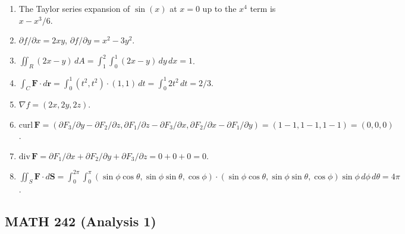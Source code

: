 \begin{enumerate}
\item The Taylor series expansion of $\sin(x)$ at $x = 0$ up to the $x^4$ term is $x - x^3/6$.
\item $\partial f/\partial x = 2xy$, $\partial f/\partial y = x^2 - 3y^2$.
\item $\iint_R (2x - y) \, dA = \int_1^2 \int_0^1 (2x - y) \, dy \, dx = 1$.
\item $\int_C \mathbf{F} \cdot d\mathbf{r} = \int_0^1 (t^2, t^2) \cdot (1, 1) \, dt = \int_0^1 2t^2 \, dt = 2/3$.
\item $\nabla f = (2x, 2y, 2z)$.
\item $\text{curl} \, \mathbf{F} = (\partial F_3/\partial y - \partial F_2/\partial z, \partial F_1/\partial z - \partial F_3/\partial x, \partial F_2/\partial x - \partial F_1/\partial y) = (1 - 1, 1 - 1, 1 - 1) = (0, 0, 0)$.
\item $\text{div} \, \mathbf{F} = \partial F_1/\partial x + \partial F_2/\partial y + \partial F_3/\partial z = 0 + 0 + 0 = 0$.
\item $\iint_S \mathbf{F} \cdot d\mathbf{S} = \int_0^{2\pi} \int_0^\pi (\sin\phi \cos\theta, \sin\phi \sin\theta, \cos\phi) \cdot (\sin\phi \cos\theta, \sin\phi \sin\theta, \cos\phi) \sin\phi \, d\phi \, d\theta = 4\pi$.
\end{enumerate}

\subsection*{MATH 242 (Analysis 1)}

